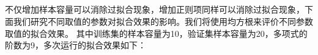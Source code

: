 \documentclass[lang=cn,a4paper,cite=authoryear]{elegantpaper}
\begin{document}
\subsection*{}
不仅增加样本容量可以消除过拟合现象，增加正则项同样可以消除过拟合现象，下面我们研究不同取值的参数对拟合效果的影响。我们将使用均方根来评价不同参数取值的拟合效果。
其中训练集的样本容量为10，验证集样本容量为20，多项式的阶数为9，多次运行的拟合效果如下：
\begin{figure}[H]
	\centering
	
\end{figure}
\end{document}
